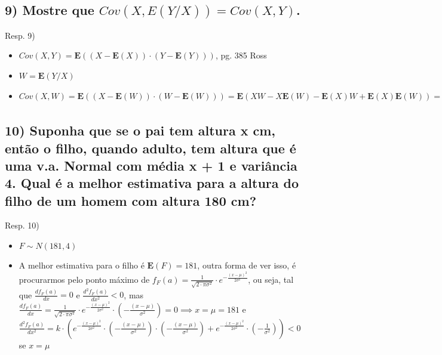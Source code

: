 \documentclass[english]{article}
\begin{document}
\subsection*{\textcompwordmark{}}


\subsection*{\textmd{9) Mostre que $Cov(X,E(Y/X))=Cov(X,Y)$.}}

Resp. 9)
\begin{itemize}
\item $Cov(X,Y)=\mathbf{E}((X-\mathbf{E}(X))\cdot(Y-\mathbf{E}(Y)))$, pg.
385 Ross
\item $W=\mathbf{E}(Y/X)$
\item $Cov(X,W)=\mathbf{E}((X-\mathbf{E}(W))\cdot(W-\mathbf{E}(W)))=\mathbf{E}(XW-X\mathbf{E}(W)-\mathbf{E}(X)W+\mathbf{E}(X)\mathbf{E}(W))=\mathbf{E}(XW)-\mathbf{E}(X\mathbf{E}(W))-\mathbf{\mathbf{E}(E}(X)W)+\mathbf{E}(X)\mathbf{E}(W)=\mathbf{E}(XW)-\mathbf{E}(X\mathbf{E}(W))=\mathbf{E}(X\mathbf{E}(Y/X))-\mathbf{E}(X)\mathbf{E}(Y)=\int_{-\infty}^{\infty}x\cdot\mathbf{E}(Y/X)\cdot f_{X}(x)dx-\mathbf{E}(X)\mathbf{E}(Y)=\int_{-\infty}^{\infty}x\cdot\int_{-\infty}^{\infty}y\cdot f_{Y/X}(x,y)dy\cdot f_{X}(x)dx-\mathbf{E}(X)\mathbf{E}(Y)=\int_{-\infty}^{\infty}x\cdot\int_{-\infty}^{\infty}y\cdot\frac{f_{X,Y}(x,y)}{f_{X}(x)}dy\cdot f_{X}(x)dx-\mathbf{E}(X)\mathbf{E}(Y)=\int_{-\infty}^{\infty}\int_{-\infty}^{\infty}x\cdot y\cdot f_{X,Y}(x,y)dxdy-\mathbf{E}(X)\mathbf{E}(Y)=\mathbf{E}(XY)-\mathbf{E}(X)\mathbf{E}(Y)=Cov(X,Y)$
\end{itemize}

\subsubsection*{\textcompwordmark{}}


\subsection*{\textmd{10) Suponha que se o pai tem altura x cm, então o filho,
quando adulto, tem altura que é uma v.a. Normal com média x + 1 e
variância 4. Qual é a melhor estimativa para a altura do filho de
um homem com altura 180 cm?}}

Resp. 10)
\begin{itemize}
\item $F\sim N(181,4)$
\item A melhor estimativa para o filho é $\mathbf{E}(F)=181$, outra forma
de ver isso, é procurarmos pelo ponto máximo de $f_{F}(a)=\frac{1}{\sqrt{2\cdot\pi\sigma^{2}}}\cdot e^{-\frac{(x-\mu)^{2}}{2\sigma^{2}}}$,
ou seja, tal que $\frac{df_{F}(a)}{dx}=0$ e $\frac{d^{2}f_{F}(a)}{dx^{2}}<0$,
mas $\frac{df_{F}(a)}{dx}=\frac{1}{\sqrt{2\cdot\pi\sigma^{2}}}\cdot e^{-\frac{(x-\mu)^{2}}{2\sigma^{2}}}\cdot\left(-\frac{(x-\mu)}{\sigma^{2}}\right)=0\implies x=\mu=181$
e $\frac{d^{2}f_{F}(a)}{dx^{2}}=k\cdot(e^{-\frac{(x-\mu)^{2}}{2\sigma^{2}}}\cdot\left(-\frac{(x-\mu)}{\sigma^{2}}\right)\cdot\left(-\frac{(x-\mu)}{\sigma^{2}}\right)+e^{-\frac{(x-\mu)^{2}}{2\sigma^{2}}}\cdot\left(-\frac{1}{\sigma^{2}}\right))<0$
se $x=\mu$
\end{itemize}
\end{document}
